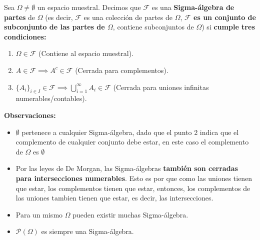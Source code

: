 \documentclass[
  letterpaper,
  DIV=11,
  numbers=noendperiod]{scrreprt}
\providecommand{\tightlist}{%
  \setlength{\itemsep}{0pt}\setlength{\parskip}{0pt}}
\begin{document}
\begin{tcolorbox}[enhanced jigsaw, arc=.35mm, bottomrule=.15mm, bottomtitle=1mm, breakable, colback=white, colbacktitle=quarto-callout-warning-color!10!white, colframe=quarto-callout-warning-color-frame, coltitle=black, left=2mm, leftrule=.75mm, opacityback=0, opacitybacktitle=0.6, rightrule=.15mm, title={Definición de Sigma-álgebra}, titlerule=0mm, toprule=.15mm, toptitle=1mm]

Sea \(\Omega \neq \emptyset\) un espacio muestral. Decimos que
\(\mathcal{F}\) es una \textbf{Sigma-álgebra de partes} de \(\Omega\)
(es decir, \(\mathcal{F}\) es una colección de partes de \(\Omega\),
\textbf{\(\mathcal{F}\) es un conjunto de subconjunto de las partes de
\(\Omega\)}, contiene subconjuntos de \(\Omega\)) si \textbf{cumple tres
condiciones:}

\begin{enumerate}
\def\labelenumi{\arabic{enumi}.}
\tightlist
\item
  \(\Omega \in \mathcal{F}\) (Contiene al espacio muestral).
\item
  \(A \in \mathcal{F} \implies A^c \in \mathcal{F}\) (Cerrada para
  complementos).
\item
  \(\{A_i\}_{i \in I} \in \mathcal{F} \implies \bigcup_{i = 1}^{\infty}A_i \in \mathcal{F}\)
  (Cerrada para uniones infinitas numerables/contables).
\end{enumerate}

\textbf{Observaciones:}

\begin{itemize}
\tightlist
\item
  \(\emptyset\) pertenece a cualquier Sigma-álgebra, dado que el punto 2
  indica que el complemento de cualquier conjunto debe estar, en este
  caso el complemento de \(\Omega\) es \(\emptyset\)
\item
  Por las leyes de De Morgan, las Sigma-álgebras \textbf{también son
  cerradas para intersecciones numerables}. Esto es por que como las
  uniones tienen que estar, los complementos tienen que estar, entonces,
  los complementos de las uniones tambien tienen que estar, es decir,
  las intersecciones.
\item
  Para un mismo \(\Omega\) pueden existir muchas Sigma-álgebra.
\item
  \(\mathcal{P}(\Omega)\) es siempre una Sigma-álgebra.
\end{itemize}

\end{tcolorbox}
\end{document}
